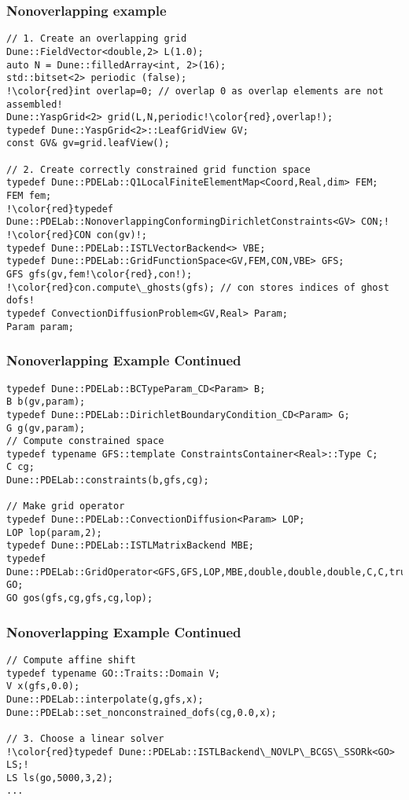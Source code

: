\begin{frame}[fragile]
  \frametitle{Nonoverlapping example}
  \begin{lstlisting}[breaklines=true,escapechar=!]
// 1. Create an overlapping grid
Dune::FieldVector<double,2> L(1.0);
auto N = Dune::filledArray<int, 2>(16);
std::bitset<2> periodic (false);
!\color{red}int overlap=0; // overlap 0 as overlap elements are not assembled!
Dune::YaspGrid<2> grid(L,N,periodic!\color{red},overlap!);
typedef Dune::YaspGrid<2>::LeafGridView GV;
const GV& gv=grid.leafView();

// 2. Create correctly constrained grid function space
typedef Dune::PDELab::Q1LocalFiniteElementMap<Coord,Real,dim> FEM;
FEM fem;
!\color{red}typedef Dune::PDELab::NonoverlappingConformingDirichletConstraints<GV> CON;!
!\color{red}CON con(gv)!;
typedef Dune::PDELab::ISTLVectorBackend<> VBE;
typedef Dune::PDELab::GridFunctionSpace<GV,FEM,CON,VBE> GFS;
GFS gfs(gv,fem!\color{red},con!);
!\color{red}con.compute\_ghosts(gfs); // con stores indices of ghost dofs!
typedef ConvectionDiffusionProblem<GV,Real> Param;
Param param;
\end{lstlisting}
\end{frame}
\begin{frame}[fragile]
\frametitle<presentation>{Nonoverlapping Example Continued}
  \begin{lstlisting}[breaklines=true]
typedef Dune::PDELab::BCTypeParam_CD<Param> B;
B b(gv,param);
typedef Dune::PDELab::DirichletBoundaryCondition_CD<Param> G;
G g(gv,param);
// Compute constrained space
typedef typename GFS::template ConstraintsContainer<Real>::Type C;
C cg;
Dune::PDELab::constraints(b,gfs,cg);

// Make grid operator
typedef Dune::PDELab::ConvectionDiffusion<Param> LOP;
LOP lop(param,2);
typedef Dune::PDELab::ISTLMatrixBackend MBE;
typedef Dune::PDELab::GridOperator<GFS,GFS,LOP,MBE,double,double,double,C,C,true> GO;
GO gos(gfs,cg,gfs,cg,lop);
\end{lstlisting}
\end{frame}
\begin{frame}[fragile]
\frametitle<presentation>{Nonoverlapping Example Continued}
  \begin{lstlisting}[breaklines=true,escapechar=!]
// Compute affine shift
typedef typename GO::Traits::Domain V;
V x(gfs,0.0);
Dune::PDELab::interpolate(g,gfs,x);
Dune::PDELab::set_nonconstrained_dofs(cg,0.0,x);

// 3. Choose a linear solver
!\color{red}typedef Dune::PDELab::ISTLBackend\_NOVLP\_BCGS\_SSORk<GO> LS;!
LS ls(go,5000,3,2);
...
\end{lstlisting}

\end{frame}


